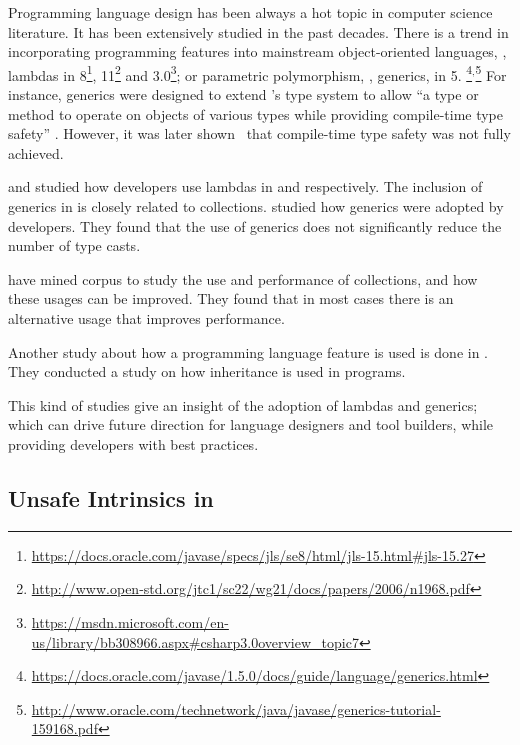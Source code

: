 Programming language design has been always a hot topic in computer science literature.
It has been extensively studied in the past decades.
There is a trend in incorporating programming features into mainstream object-oriented languages, \eg,
lambdas in \java{} 8\footnote{\url{https://docs.oracle.com/javase/specs/jls/se8/html/jls-15.html\#jls-15.27}},
\cpp{}11\footnote{\url{http://www.open-std.org/jtc1/sc22/wg21/docs/papers/2006/n1968.pdf}} and
\csharp{} 3.0\footnote{\url{https://msdn.microsoft.com/en-us/library/bb308966.aspx\#csharp3.0overview\_topic7}};
or parametric polymorphism, \ie{}, generics, in \java{} 5.%
\footnote{\url{https://docs.oracle.com/javase/1.5.0/docs/guide/language/generics.html}}\(^{,}\)\footnote{\url{http://www.oracle.com/technetwork/java/javase/generics-tutorial-159168.pdf}}
For instance, \java{} generics were designed to extend
\java's type system to allow
``a type or method to operate on objects of various types while
providing compile-time type safety''
\citep{Gosling:2013:JLS:2462622}.
However, it was later shown~\citep{aminJavaScalaType2016} that 
compile-time type safety was not fully achieved.

\cite{mazinanianUnderstandingUseLambda2017} and \cite{uesbeckEmpiricalStudyImpact2016} studied how developers use lambdas in \java{} and \cpp{} respectively.
The inclusion of generics in \java{} is closely related to collections. 
\cite{parninJavaGenericsAdoption2011,parninAdoptionUseJava2013} studied how generics were adopted by \java{} developers.
They found that the use of generics does not significantly reduce the number of type casts.

\cite{costaEmpiricalStudyUsage2017} have mined \github{} corpus to study the use and performance of collections,
and how these usages can be improved.
They found that in most cases there is an alternative usage that improves performance.

Another study about how a programming language feature is used is done in
\cite{temperoHowJavaPrograms2008}.
They conducted a study on how inheritance is used in \java{} programs.

This kind of studies give an insight of the adoption of lambdas and generics; which can drive future direction for language designers and tool builders, while providing developers with best practices.


\subsection{Unsafe Intrinsics in \java}
\label{sec:literature-review:unsafe}


